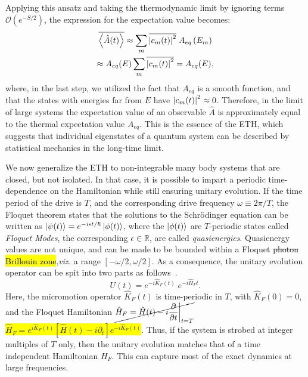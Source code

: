 \documentclass[%
reprint,
superscriptaddress,
linenumbers,
amsmath,amssymb,
aps,
prb,
showkeys,
]{revtex4-2}
\begin{document}
Applying this ansatz and taking the thermodynamic limit by ignoring terms $\mathcal{O}(e^{-S/2})$, the expression for the expectation value becomes:
\begin{multline*}
\overline{\expval{\hat{A}(t)}} \approx \sum_m \overline{\abs{c_m(t)}^2}\; {A}_{eq}\left(E_m\right)\\
 \approx {A}_{eq}(E)\sum_m \overline{\abs{c_m(t)}^2} = A_{eq}(E),
\end{multline*}
where, in the last step, we utilized the fact that $A_{eq}$ is a smooth function, and that the states with energies far from $E$ have $\abs{c_m(t)}^2\approx 0$. Therefore, in the limit of large systems the expectation value of an observable $\hat{A}$ is approximately equal to the thermal expectation value $A_{eq}$. This is the essence of the ETH, which suggests that individual eigenstates of a quantum system can be described by statistical mechanics in the long-time limit.

We now generalize the ETH to non-integrable many body systems that are closed, but not isolated. In that case, it is possible to impart a periodic time-dependence on the Hamiltonian while still ensuring unitary evolution. If the time period of the drive is $T$, and the corresponding drive frequency $\omega\equiv 2\pi/T$, the Floquet theorem states that the solutions to the Schrödinger equation can be written as $\ket{\psi(t)} = e^{-i\epsilon t/\hbar} \ket{\phi(t)}$, where the $\ket{\phi(t)}$ are $T$-periodic states called \textit{Floquet Modes}, the corresponding $\epsilon\in \mathbb{R}$, are called \textit{quasienergies}. Quasienergy values are not unique, and can be made to be bounded within a Floquet \st{photon} \hl{Brillouin zone},\textit{viz.} a range $[-\omega/2, \omega/2]$\cite{holthaus_floquet_2016,vogl_effective_2020}. As a consequence, the unitary evolution operator can be spit into two parts as follows~\cite{Bukov2014}.
\begin{equation}
	\label{eq:propagator}
	U(t) = e^{-i\hat{K}_F(t)}\;e^{-i\hat{H}_Ft}.
\end{equation}
Here, the micromotion operator $\hat{K}_F(t)$ is time-periodic in $T$, with $\hat{K}_F(0)=0$, and the Floquet Hamiltonian $\cancel{\hat{H}_F = \hat{H}(t) - i \displaystyle\frac{\partial}{\partial t}\bigg\vert_{t=T}}$ \colorbox{yellow}{$\hat{H}_F = e^{i\hat{K}_F(t)} \left[\hat{H}(t)-i\partial_t\right] e^{-i \hat{K}_F(t)}$}. Thus, if the system is strobed at integer multiples of $T$ only, then the unitary evolution matches that of a time independent Hamiltonian $H_F$. This can capture most of the exact dynamics at large frequencies.
\end{document}
